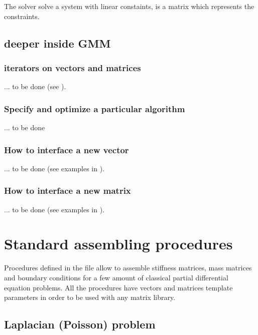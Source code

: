 \documentclass[11pt,a4paper]{article}
\begin{document}
The solver  solve a system with linear constaints,  is a matrix which represents the constraints.

\subsection{deeper inside GMM}

\subsubsection{iterators on vectors and matrices}
... to be done (see ).

\subsubsection{Specify and optimize a particular algorithm}
... to be done

\subsubsection{How to interface a new vector}
... to be done (see examples in ).

\subsubsection{How to interface a new matrix}
... to be done (see examples in ).

\section{Standard assembling procedures}

Procedures defined in the file  allow to assemble stiffness matrices, mass matrices and boundary conditions for a few amount of classical partial differential equation problems. All the procedures have vectors and matrices template parameters in order to be used with any matrix library.

\subsection{Laplacian (Poisson) problem}
\end{document}

